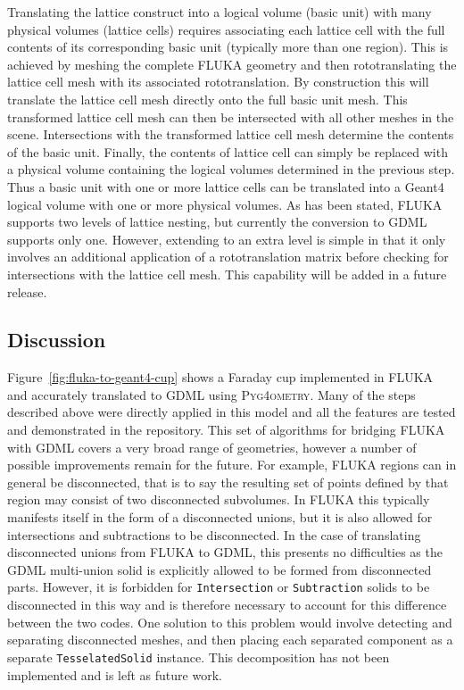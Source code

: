 \documentclass[preprint,12pt]{elsarticle}
\newcommand{\pyinline}[1]{\lstinline[postbreak={}]{#1}}
\newcommand{\PYGEOMETRY}{\textsc{Pyg4ometry}}
\begin{document}
Translating the lattice construct into a logical volume (basic unit) with
many physical volumes (lattice cells) requires associating each lattice
cell with the full contents of its corresponding basic unit (typically more
than one region). This is achieved by meshing the complete FLUKA geometry
and then rototranslating the lattice cell mesh with its associated
rototranslation. By construction this will translate the lattice cell mesh
directly onto the full basic unit mesh. This transformed lattice cell mesh
can then be intersected with all other meshes in the scene.  Intersections
with the transformed lattice cell mesh determine the contents of the basic
unit.  Finally, the contents of lattice cell can simply be replaced with a physical
volume containing the logical volumes determined in the previous step.
Thus a basic unit with one or more lattice cells can be translated into a
Geant4 logical volume with one or more physical volumes. As has been
stated, FLUKA supports two levels of lattice nesting, but currently the
conversion to GDML supports only one. However, extending to an extra level
is simple in that it only involves an additional application of a
rototranslation matrix before checking for intersections with the lattice
cell mesh.  This capability will be added in a future release.

\subsection{Discussion}

Figure~\ref{fig:fluka-to-geant4-cup} shows a Faraday cup implemented in
FLUKA and accurately translated to GDML using \PYGEOMETRY{}.  Many of the
steps described above were directly applied in this model and all the
features are tested and demonstrated in the repository.  This set of
algorithms for bridging FLUKA with GDML covers a very broad range of
geometries, however a number of possible improvements remain for the
future.
For example, FLUKA regions can in general be disconnected, that is
to say the resulting set of points defined by that region may consist of
two disconnected subvolumes.  In FLUKA this typically manifests itself in
the form of a disconnected unions, but it is also allowed for intersections
and subtractions to be disconnected.  In the case of translating
disconnected unions from FLUKA to GDML, this presents no difficulties as
the GDML multi-union solid is explicitly allowed to be formed from
disconnected parts.  However, it is forbidden for \pyinline{Intersection} or
\pyinline{Subtraction} solids to be disconnected in this way and is
therefore necessary to account for this difference between the two codes.
One solution to this problem would involve detecting and separating
disconnected meshes, and then placing each separated component as a
separate \pyinline{TesselatedSolid} instance.  This decomposition has not
been implemented and is left as future work.
\end{document}

